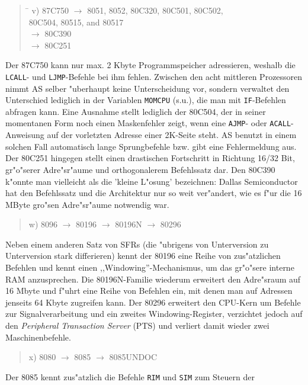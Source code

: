 \documentclass[12pt,a4paper,twoside]{report}
\newcommand{\tty}[1]{{\tt #1}}
\begin{document}
{%
\begin{quote}
\begin{tabbing}
\hspace{0.7cm} \= \kill
v) \> 87C750 $\rightarrow$ 8051, 8052, 80C320, 80C501, 80C502, \\
   \> 80C504, 80515, and 80517 \\
   \> $\rightarrow$ 80C390 \\
   \> $\rightarrow$ 80C251
\end{tabbing}
\end{quote}
Der 87C750 kann nur max. 2 Kbyte Programmspeicher adressieren, weshalb
die \tty{LCALL}- und \tty{LJMP}-Befehle bei ihm fehlen.  Zwischen den
acht mittleren Prozessoren nimmt AS selber "uberhaupt keine Unterscheidung
vor, sondern verwaltet den Unterschied lediglich in der Variablen
\tty{MOMCPU} (s.u.), die man mit \tty{IF}-Befehlen abfragen kann.  Eine
Ausnahme stellt lediglich der 80C504, der in seiner momentanen Form noch einen
Maskenfehler zeigt, wenn eine \tty{AJMP}- oder \tty{ACALL}-Anweisung auf der
vorletzten Adresse einer 2K-Seite steht.  AS benutzt in einem solchen
Fall automatisch lange Sprungbefehle bzw. gibt eine Fehlermeldung aus.  Der
80C251 hingegen stellt einen drastischen Fortschritt in Richtung 16/32 Bit,
gr"o"serer Adre"sr"aume und orthogonalerem Befehlssatz dar.  Den 80C390
k"onnte man vielleicht als die 'kleine L"osung' bezeichnen:  Dallas
Semiconductor hat den Befehlssatz und die Architektur nur so weit
ver"andert, wie es f"ur die 16 MByte gro"sen Adre"sr"aume notwendig war.
\begin{quote}
w) 8096 $\rightarrow$ 80196 $\rightarrow$ 80196N $\rightarrow$ 80296
\end{quote}
Neben einem anderen Satz von SFRs (die "ubrigens von Unterversion zu
Unterversion stark differieren) kennt der 80196 eine Reihe von
zus"atzlichen Befehlen und kennt einen ,,Windowing''-Mechanismus, um
das gr"o"sere interne RAM anzusprechen.  Die 80196N-Familie wiederum
erweitert den Adre"sraum auf 16 Mbyte und f"uhrt eine Reihe von
Befehlen ein, mit denen man auf Adressen jenseits 64 Kbyte zugreifen
kann.  Der 80296 erweitert den CPU-Kern um Befehle zur Signalverarbeitung
und ein zweites Windowing-Register, verzichtet jedoch auf den {\em 
Peripheral Transaction Server} (PTS) und verliert damit wieder zwei 
Maschinenbefehle.
\begin{quote}
x) 8080 $\rightarrow$ 8085 $\rightarrow$ 8085UNDOC
\end{quote}
Der 8085 kennt zus"atzlich die Befehle \tty{RIM} und \tty{SIM} zum Steuern der
}
\end{document}
